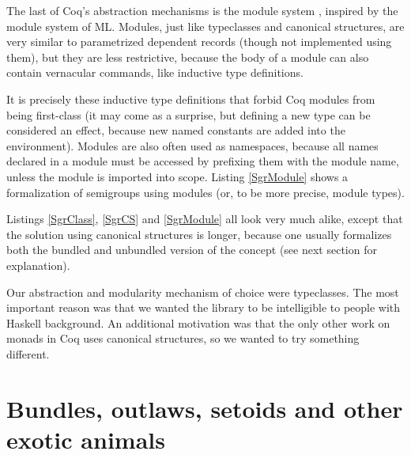 \documentclass[declaration,inz,english,shortabstract]{iithesis}
\begin{document}
The last of Coq's abstraction mechanisms is the module system \cite{Modules1} \cite{Modules2}, inspired by the module system of ML. Modules, just like typeclasses and canonical structures, are very similar to parametrized dependent records (though not implemented using them), but they are less restrictive, because the body of a module can also contain vernacular commands, like inductive type definitions.

It is precisely these inductive type definitions that forbid Coq modules from being first-class (it may come as a surprise, but defining a new type can be considered an effect, because new named constants are added into the environment). Modules are also often used as namespaces, because all names declared in a module must be accessed by prefixing them with the module name, unless the module is imported into scope. Listing \ref{SgrModule} shows a formalization of semigroups using modules (or, to be more precise, module types).


Listings \ref{SgrClass}, \ref{SgrCS} and \ref{SgrModule} all look very much alike, except that the solution using canonical structures is longer, because one usually formalizes both the bundled and unbundled version of the concept (see next section for explanation).

Our abstraction and modularity mechanism of choice were typeclasses. The most important reason was that we wanted the library to be intelligible to people with Haskell background. An additional motivation was that the only other work on monads in Coq \cite{MERC} uses canonical structures, so we wanted to try something different.

\section{Bundles, outlaws, setoids and other exotic animals}
\end{document}
